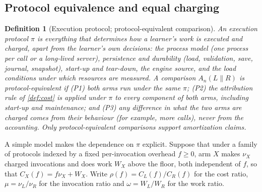 \documentclass[11pt]{article}
\newtheorem{definition}{Definition}
\theoremstyle{remark}
\begin{document}
\subsection{Protocol equivalence and equal charging}\label{sec:protocol}
\begin{definition}[Execution protocol; protocol-equivalent comparison]\label{def:protocol-eq}
An \emph{execution protocol} $\pi$ is everything that determines how a learner's work is executed and charged, apart from the learner's own decisions: the process model (one process per call or a long-lived server), persistence and durability (load, validation, save, journal, snapshot), start-up and tear-down, the engine source, and the load conditions under which resources are measured.
A comparison $A_n(L\|R)$ is \emph{protocol-equivalent} if (P1) both arms run under the same $\pi$; (P2) the attribution rule of \cref{def:cost} is applied under $\pi$ to every component of both arms, including start-up and maintenance; and (P3) any difference in what the two arms are charged comes from their behaviour (for example, more calls), never from the accounting. Only protocol-equivalent comparisons support amortization claims.
\end{definition}

A simple model makes the dependence on $\pi$ explicit. Suppose that under a family of protocols indexed by a fixed per-invocation overhead $f\ge 0$, arm $X$ makes $\nu_X$ charged invocations and does work $W_X$ above the floor, both independent of $f$, so that $C_X(f)=f\nu_X+W_X$. Write $\rho(f)=C_L(f)/C_R(f)$ for the cost ratio, $\mu=\nu_L/\nu_R$ for the invocation ratio and $\omega=W_L/W_R$ for the work ratio.
\end{document}
